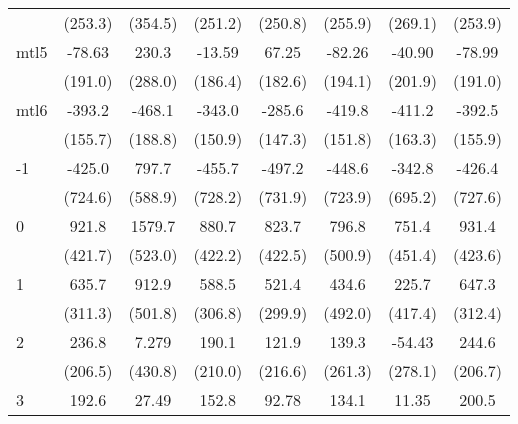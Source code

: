 \documentclass{article}
\begin{document}
{\begin{longtable}{l*{7}{c}}
                &  (253.3)         &  (354.5)         &  (251.2)         &  (250.8)         &  (255.9)         &  (269.1)         &  (253.9)         \\
mtl5            &   -78.63         &    230.3         &   -13.59         &    67.25         &   -82.26         &   -40.90         &   -78.99         \\
                &  (191.0)         &  (288.0)         &  (186.4)         &  (182.6)         &  (194.1)         &  (201.9)         &  (191.0)         \\
mtl6            &   -393.2\sym{*}  &   -468.1\sym{*}  &   -343.0\sym{*}  &   -285.6         &   -419.8\sym{*}  &   -411.2\sym{*}  &   -392.5\sym{*}  \\
                &  (155.7)         &  (188.8)         &  (150.9)         &  (147.3)         &  (151.8)         &  (163.3)         &  (155.9)         \\
-1              &   -425.0         &    797.7         &   -455.7         &   -497.2         &   -448.6         &   -342.8         &   -426.4         \\
                &  (724.6)         &  (588.9)         &  (728.2)         &  (731.9)         &  (723.9)         &  (695.2)         &  (727.6)         \\
0               &    921.8\sym{*}  &   1579.7\sym{**} &    880.7\sym{*}  &    823.7         &    796.8         &    751.4         &    931.4\sym{*}  \\
                &  (421.7)         &  (523.0)         &  (422.2)         &  (422.5)         &  (500.9)         &  (451.4)         &  (423.6)         \\
1               &    635.7         &    912.9         &    588.5         &    521.4         &    434.6         &    225.7         &    647.3\sym{*}  \\
                &  (311.3)         &  (501.8)         &  (306.8)         &  (299.9)         &  (492.0)         &  (417.4)         &  (312.4)         \\
2               &    236.8         &    7.279         &    190.1         &    121.9         &    139.3         &   -54.43         &    244.6         \\
                &  (206.5)         &  (430.8)         &  (210.0)         &  (216.6)         &  (261.3)         &  (278.1)         &  (206.7)         \\
3               &    192.6         &    27.49         &    152.8         &    92.78         &    134.1         &    11.35         &    200.5         \\

\end{longtable}}
\end{document}

